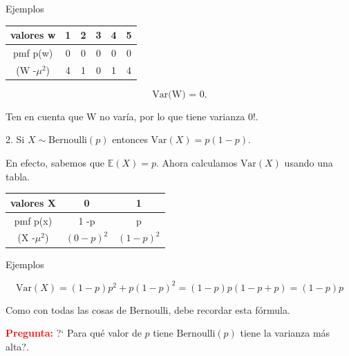 \documentclass[10pt]{beamer}
\begin{document}
\begin{frame}{Ejemplos}
\small{
\begin{table}[]
	
	\begin{tabular}{c|ccccc}
		valores  w & 1   & 2   & 3    & 4    & 5   \\
		\hline
		pmf p(w)   & 0 & 0 & 0 & 0 & 0\\
		\hline
		(W -$\mu^2$) & 4 & 1 & 0 & 1 & 4 
	\end{tabular}
\end{table}

\[
\text{Var(W) = 0}.
\]

Ten en cuenta que W no var\'ia, por lo que tiene varianza 0!.

\vspace{0.2cm}

2. Si $X \sim \text{Bernoulli}(p)$ entonces $\text{Var}(X)	= p(1 - p)$. 


En efecto, sabemos que $\mathbb{E}(X) = p$. Ahora calculamos $\text{Var}(X)$ usando una tabla.

\begin{table}[]
	
	\begin{tabular}{c|cc}
		valores  X & 0    & 1     \\
		\hline
		pmf p(x)   & 1 -p & p \\
		\hline
		(X -$\mu^2$) & $(0 - p)^2$ & $(1 -p)^2$	 
	\end{tabular}
\end{table}

}
\end{frame}

\begin{frame}{Ejemplos}
	\small{
\[
\text{Var}(X) = (1 - p)p^2 + p(1 - p)^2 = (1 - p)p(1 - p + p) = (1 - p)p
\]

Como con todas las cosas de Bernoulli, debe recordar esta f\'ormula.


\vspace{0.3cm}

\textcolor{red}{\textbf{Pregunta:}} ?` Para qu\'e valor de $p$ tiene  $\text{Bernoulli}(p)$ tiene la varianza m\'as alta?.


\vspace{4.2cm}

}

\end{frame}
\end{document}
